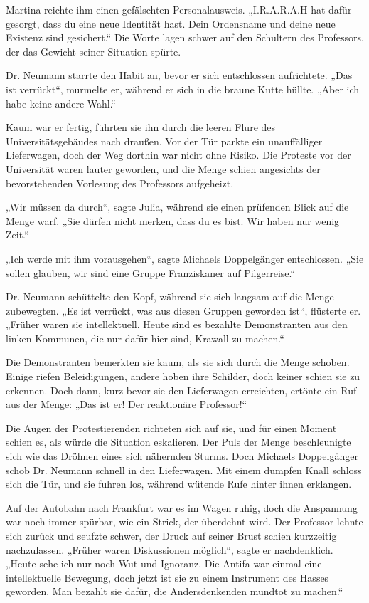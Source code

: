 \documentclass[
]{article}
\begin{document}
Martina reichte ihm einen gefälschten Personalausweis. „I.R.A.R.A.H hat
dafür gesorgt, dass du eine neue Identität hast. Dein Ordensname und
deine neue Existenz sind gesichert.`` Die Worte lagen schwer auf den
Schultern des Professors, der das Gewicht seiner Situation spürte.

Dr. Neumann starrte den Habit an, bevor er sich entschlossen
aufrichtete. „Das ist verrückt``, murmelte er, während er sich in die
braune Kutte hüllte. „Aber ich habe keine andere Wahl.``

Kaum war er fertig, führten sie ihn durch die leeren Flure des
Universitätsgebäudes nach draußen. Vor der Tür parkte ein unauffälliger
Lieferwagen, doch der Weg dorthin war nicht ohne Risiko. Die Proteste
vor der Universität waren lauter geworden, und die Menge schien
angesichts der bevorstehenden Vorlesung des Professors aufgeheizt.

„Wir müssen da durch``, sagte Julia, während sie einen prüfenden Blick
auf die Menge warf. „Sie dürfen nicht merken, dass du es bist. Wir haben
nur wenig Zeit.``

„Ich werde mit ihm vorausgehen``, sagte Michaels Doppelgänger
entschlossen. „Sie sollen glauben, wir sind eine Gruppe Franziskaner auf
Pilgerreise.``

Dr. Neumann schüttelte den Kopf, während sie sich langsam auf die Menge
zubewegten. „Es ist verrückt, was aus diesen Gruppen geworden ist``,
flüsterte er. „Früher waren sie intellektuell. Heute sind es bezahlte
Demonstranten aus den linken Kommunen, die nur dafür hier sind, Krawall
zu machen.``

Die Demonstranten bemerkten sie kaum, als sie sich durch die Menge
schoben. Einige riefen Beleidigungen, andere hoben ihre Schilder, doch
keiner schien sie zu erkennen. Doch dann, kurz bevor sie den Lieferwagen
erreichten, ertönte ein Ruf aus der Menge: „Das ist er! Der reaktionäre
Professor!{\kern0pt}``

Die Augen der Protestierenden richteten sich auf sie, und für einen
Moment schien es, als würde die Situation eskalieren. Der Puls der Menge
beschleunigte sich wie das Dröhnen eines sich nähernden Sturms. Doch
Michaels Doppelgänger schob Dr. Neumann schnell in den Lieferwagen. Mit
einem dumpfen Knall schloss sich die Tür, und sie fuhren los, während
wütende Rufe hinter ihnen erklangen.

Auf der Autobahn nach Frankfurt war es im Wagen ruhig, doch die
Anspannung war noch immer spürbar, wie ein Strick, der überdehnt wird.
Der Professor lehnte sich zurück und seufzte schwer, der Druck auf
seiner Brust schien kurzzeitig nachzulassen. „Früher waren Diskussionen
möglich``, sagte er nachdenklich. „Heute sehe ich nur noch Wut und
Ignoranz. Die Antifa war einmal eine intellektuelle Bewegung, doch jetzt
ist sie zu einem Instrument des Hasses geworden. Man bezahlt sie dafür,
die Andersdenkenden mundtot zu machen.``
\end{document}
